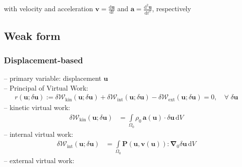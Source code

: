 \documentclass[a4paper,12pt]{report}
\newcommand{\bs}[1]{\boldsymbol{#1}}
\newcommand{\Om}{\mathit{\Omega}}
\begin{document}
with velocity and acceleration $\bs{v}=\frac{\mathrm{d}\bs{u}}{\mathrm{d}t}$ and $\bs{a}=\frac{\mathrm{d}^2\bs{u}}{\mathrm{d}t^2}$, respectively

\subsection{Weak form}

\subsubsection{Displacement-based}
-- primary variable: displacement $\bs{u}$\\

-- Principal of Virtual Work:
\begin{align}
r(\bs{u};\delta\bs{u}) := \delta \mathcal{W}_{\mathrm{kin}}(\bs{u};\delta\bs{u}) + \delta \mathcal{W}_{\mathrm{int}}(\bs{u};\delta\bs{u}) - \delta \mathcal{W}_{\mathrm{ext}}(\bs{u};\delta\bs{u}) = 0, \quad \forall \; \delta\bs{u}\label{eq:res_u_solid}
\end{align}
-- kinetic virtual work:
\begin{align}
\delta \mathcal{W}_{\mathrm{kin}}(\bs{u};\delta\bs{u}) &= \int\limits_{\Om_{0}} \rho_{0}\,\bs{a}(\bs{u}) \cdot \delta\bs{u} \,\mathrm{d}V \label{eq:deltaWkin}
\end{align}
-- internal virtual work:
\begin{align}
\delta \mathcal{W}_{\mathrm{int}}(\bs{u};\delta\bs{u}) &= \int\limits_{\Om_{0}} \bs{P}(\bs{u},\bs{v}(\bs{u})) : \bs{\nabla}_{0} \delta\bs{u} \,\mathrm{d}V \label{eq:deltaWint}
\end{align}
-- external virtual work:\\
\end{document}

